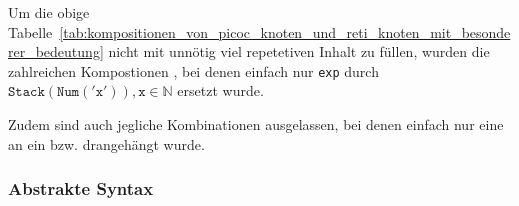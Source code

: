 \begin{Special_Paragraph}
  Um die obige Tabelle~\ref{tab:kompositionen_von_picoc_knoten_und_reti_knoten_mit_besonderer_bedeutung} nicht mit unnötig viel repetetiven Inhalt zu füllen, wurden die zahlreichen Kompostionen , bei denen einfach nur \verb|exp| durch $\mathtt{Stack(Num('x')), x}\in\mathbb{N}$ ersetzt wurde.

  Zudem sind auch jegliche Kombinationen ausgelassen, bei denen einfach nur eine  an ein  bzw.   drangehängt wurde.
\end{Special_Paragraph}

\subsubsection{Abstrakte Syntax}
\label{sec:abstrakte_syntax}

